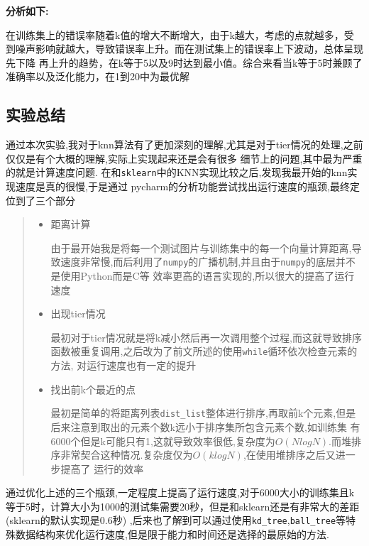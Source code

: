 \documentclass[UTF8]{ctexart}
\begin{document}
\textbf{分析如下:}

在训练集上的错误率随着k值的增大不断增大，由于k越大，考虑的点就越多，受到噪声影响就越大，导致错误率上升。而在测试集上的错误率上下波动，总体呈现先下降
再上升的趋势，在k等于5以及9时达到最小值。综合来看当k等于5时兼顾了准确率以及泛化能力，在1到20中为最优解

\newpage
\subsection{实验总结}
通过本次实验,我对于knn算法有了更加深刻的理解,尤其是对于tier情况的处理,之前仅仅是有个大概的理解,实际上实现起来还是会有很多
细节上的问题,其中最为严重的就是计算速度问题. 在和\lstinline{sklearn}中的KNN实现比较之后,发现我最开始的knn实现速度是真的很慢,于是通过
pycharm的分析功能尝试找出运行速度的瓶颈,最终定位到了三个部分
\begin{quote}
    \begin{itemize}
        \item 距离计算

        由于最开始我是将每一个测试图片与训练集中的每一个向量计算距离,导致速度非常慢,而后利用了\lstinline{numpy}的广播机制,并且由于\lstinline{numpy}的底层并不是使用Python而是C等
        效率更高的语言实现的,所以很大的提高了运行速度
        \item 出现tier情况

        最初对于tier情况就是将k减小然后再一次调用整个过程,而这就导致排序函数被重复调用,之后改为了前文所述的使用\lstinline{while}循环依次检查元素的方法,
        对运行速度也有一定的提升
        \item 找出前k个最近的点
        
        最初是简单的将距离列表\lstinline{dist_list}整体进行排序,再取前k个元素,但是后来注意到取出的元素个数k远小于排序集所包含元素个数,如训练集
        有6000个但是k可能只有1,这就导致效率很低,复杂度为$O(Nlog N)$.而堆排序非常契合这种情况.复杂度仅为$O(klogN)$,在使用堆排序之后又进一步提高了
        运行的效率
    \end{itemize}
\end{quote}
通过优化上述的三个瓶颈,一定程度上提高了运行速度,对于6000大小的训练集且k等于5时，计算大小为1000的测试集需要20秒，但是和sklearn还是有非常大的差距(sklearn的默认实现是0.6秒)
,后来也了解到可以通过使用\lstinline{kd_tree},\lstinline{ball_tree}等特殊数据结构来优化运行速度,但是限于能力和时间还是选择的最原始的方法.
\end{document}
